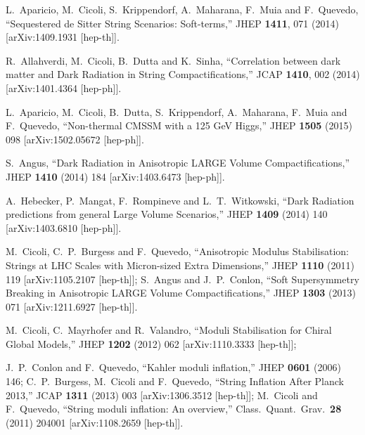 \documentclass[11pt,a4paper]{article}
\begin{document}
\begin{thebibliography}{99}
L.~Aparicio, M.~Cicoli, S.~Krippendorf, A.~Maharana, F.~Muia and F.~Quevedo,
  ``Sequestered de Sitter String Scenarios: Soft-terms,''
  JHEP {\bf 1411}, 071 (2014)
  [arXiv:1409.1931 [hep-th]].

  R.~Allahverdi, M.~Cicoli, B.~Dutta and K.~Sinha,
  ``Correlation between dark matter and Dark Radiation in String Compactifications,''
  JCAP {\bf 1410}, 002 (2014)
  [arXiv:1401.4364 [hep-ph]].

L.~Aparicio, M.~Cicoli, B.~Dutta, S.~Krippendorf, A.~Maharana, F.~Muia and F.~Quevedo,
  ``Non-thermal CMSSM with a 125 GeV Higgs,''
  JHEP {\bf 1505} (2015) 098
  [arXiv:1502.05672 [hep-ph]].

  S.~Angus,
  ``Dark Radiation in Anisotropic LARGE Volume Compactifications,''
  JHEP {\bf 1410} (2014) 184
  [arXiv:1403.6473 [hep-ph]].

  A.~Hebecker, P.~Mangat, F.~Rompineve and L.~T.~Witkowski,
  ``Dark Radiation predictions from general Large Volume Scenarios,''
  JHEP {\bf 1409} (2014) 140
  [arXiv:1403.6810 [hep-ph]].

  M.~Cicoli, C.~P.~Burgess and F.~Quevedo,
  ``Anisotropic Modulus Stabilisation: Strings at LHC Scales with Micron-sized Extra Dimensions,''
  JHEP {\bf 1110} (2011) 119
  [arXiv:1105.2107 [hep-th]];
S.~Angus and J.~P.~Conlon,
  ``Soft Supersymmetry Breaking in Anisotropic LARGE Volume Compactifications,''
  JHEP {\bf 1303} (2013) 071
  [arXiv:1211.6927 [hep-th]].

M.~Cicoli, C.~Mayrhofer and R.~Valandro,
  ``Moduli Stabilisation for Chiral Global Models,''
  JHEP {\bf 1202} (2012) 062
  [arXiv:1110.3333 [hep-th]];

  J.~P.~Conlon and F.~Quevedo,
  ``Kahler moduli inflation,''
  JHEP {\bf 0601} (2006) 146;
 C.~P.~Burgess, M.~Cicoli and F.~Quevedo,
  ``String Inflation After Planck 2013,''
  JCAP {\bf 1311} (2013) 003
  [arXiv:1306.3512 [hep-th]];
  M.~Cicoli and F.~Quevedo,
  ``String moduli inflation: An overview,''
  Class.\ Quant.\ Grav.\  {\bf 28} (2011) 204001
  [arXiv:1108.2659 [hep-th]].


\end{thebibliography}
\end{document}

